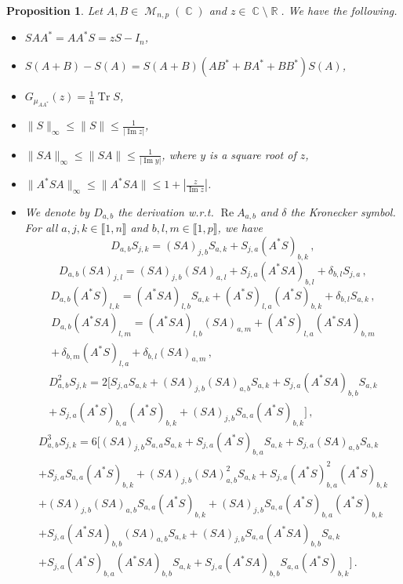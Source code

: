\documentclass[11pt,a4paper]{article}
\DeclareMathOperator{\R}{\mathbb{R}}
\DeclareMathOperator{\C}{\mathbb{C}}
\DeclareMathOperator{\MM}{\mathcal{M}}
\DeclareMathOperator{\1}{\mathbf{1}}
\DeclareMathOperator{\Reel}{\mathrm{Re}}
\DeclareMathOperator{\Imag}{\mathrm{Im}}
\DeclareMathOperator{\Tr}{\mathrm{Tr}}
\newtheorem{Proposition}{Proposition}[section]
\theoremstyle{definition}
\begin{document}
\begin{Proposition} \label{resolvent_covariance}
Let $A,B \in \MM_{n,p}(\C)$ and $z \in \C \setminus \R$. We have the following.
\begin{itemize}
\item[(i)] $SAA^* = AA^*S = zS - I_n$,
\item[(ii)] $S(A+B)-S(A) = S(A+B)(AB^*+BA^*+BB^*)S(A)$,
\item[(iii)] $G_{\mu_{AA^*}}(z) = \frac1n \Tr S$,
\item[(iv)] $\|S\|_{\infty} \le \|S\| \le \frac{1}{|\Imag z|}$,
\item[(v)] $\|SA\|_{\infty} \le \|SA\| \le \frac{1}{|\Imag y|}$, where $y$ is a square root of $z$,
\item[(vi)] $\|A^*SA\|_{\infty} \le \|A^*SA\| \le 1 + \left| \frac{z}{\Imag z} \right|$.
\item[(vii)] We denote by $D_{a,b}$ the derivation w.r.t. $\Reel A_{a,b}$ and $\delta$ the Kronecker symbol. For all $a,j,k \in \llbracket 1,n \rrbracket$ and $b,l,m \in \llbracket 1,p \rrbracket$, we have
\begin{equation} \label{DabSjk}
D_{a,b}S_{j,k} = (SA)_{j,b}S_{a,k} + S_{j,a}(A^*S)_{b,k} \, ,
\end{equation}
\begin{equation} \label{Dab(SX)jk}
D_{a,b}(SA)_{j,l} = (SA)_{j,b}(SA)_{a,l} + S_{j,a}(A^*SA)_{b,l} + \delta_{b,l} S_{j,a} \, ,
\end{equation}
\begin{equation} \label{Dab(X^*S)jk}
D_{a,b}(A^*S)_{l,k} = (A^*SA)_{l,b}S_{a,k} + (A^*S)_{l,a}(A^*S)_{b,k} + \delta_{b,l} S_{a,k} \, ,
\end{equation}
\begin{multline} \label{Dab(X^*SX)jk}
D_{a,b}(A^*SA)_{l,m} = (A^*SA)_{l,b}(SA)_{a,m} + (A^*S)_{l,a}(A^*SA)_{b,m} \\
+ \, \delta_{b,m} (A^*S)_{l,a} + \delta_{b,l} (SA)_{a,m} \, ,
\end{multline}
\begin{multline} \label{D2abSjk}
D^2_{a,b}S_{j,k} = 2 [S_{j,a}S_{a,k} + (SA)_{j,b}(SA)_{a,b}S_{a,k} + S_{j,a}(A^*SA)_{b,b}S_{a,k} \\
+ \, S_{j,a}(A^*S)_{b,a}(A^*S)_{b,k} + (SA)_{j,b}S_{a,a}(A^*S)_{b,k}] \, ,
\end{multline}
\begin{multline} \label{D3abSjk}
D^3_{a,b}S_{j,k} = 6 [(SA)_{j,b}S_{a,a}S_{a,k} + S_{j,a}(A^*S)_{b,a}S_{a,k} + S_{j,a}(SA)_{a,b}S_{a,k} \\
+ S_{j,a}S_{a,a}(A^*S)_{b,k} + (SA)_{j,b}(SA)_{a,b}^2S_{a,k} + S_{j,a}(A^*S)_{b,a}^2(A^*S)_{b,k} \\
+ (SA)_{j,b}(SA)_{a,b}S_{a,a}(A^*S)_{b,k} + (SA)_{j,b}S_{a,a}(A^*S)_{b,a}(A^*S)_{b,k} \\
+ S_{j,a}(A^*SA)_{b,b}(SA)_{a,b}S_{a,k} + (SA)_{j,b}S_{a,a}(A^*SA)_{b,b}S_{a,k} \\
+ S_{j,a}(A^*S)_{b,a}(A^*SA)_{b,b}S_{a,k} + S_{j,a}(A^*SA)_{b,b}S_{a,a}(A^*S)_{b,k}] \, .
\end{multline}
\end{itemize}
\end{Proposition}
\end{document}
